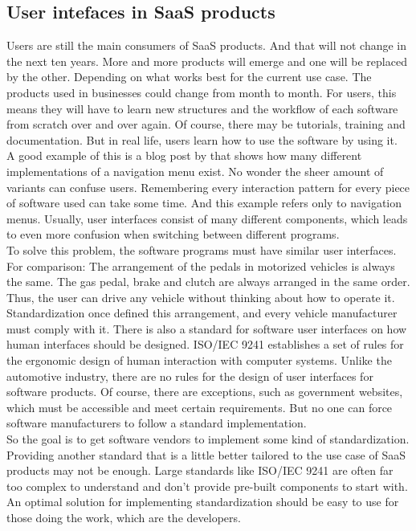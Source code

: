 \subsection{User intefaces in \ac{SaaS} products}
Users are still the main consumers of \ac{SaaS} products. And that will not change in the next ten years. More and more products will emerge and one will be replaced by the other. Depending on what works best for the current use case. The products used in businesses could change from month to month. For users, this means they will have to learn new structures and the workflow of each software from scratch over and over again. Of course, there may be tutorials, training and documentation. But in real life, users learn how to use the software by using it. \\
A good example of this is a blog post by \citeauthor{sernoff_website_2021} that shows how many different implementations of a navigation menu exist. No wonder the sheer amount of variants can confuse users. Remembering every interaction pattern for every piece of software used can take some time. And this example refers only to navigation menus. Usually, user interfaces consist of many different components, which leads to even more confusion when switching between different programs. \\
To solve this problem, the software programs must have similar user interfaces. For comparison: The arrangement of the pedals in motorized vehicles is always the same. The gas pedal, brake and clutch are always arranged in the same order. Thus, the user can drive any vehicle without thinking about how to operate it. Standardization once defined this arrangement, and every vehicle manufacturer must comply with it. There is also a standard for software user interfaces on how human interfaces should be designed. ISO/IEC 9241 establishes a set of rules for the ergonomic design of human interaction with computer systems. Unlike the automotive industry, there are no rules for the design of user interfaces for software products. Of course, there are exceptions, such as government websites, which must be accessible and meet certain requirements. But no one can force software manufacturers to follow a standard implementation. \\
So the goal is to get software vendors to implement some kind of standardization. Providing another standard that is a little better tailored to the use case of \ac{SaaS} products may not be enough. Large standards like ISO/IEC 9241 are often far too complex to understand and don't provide pre-built components to start with. An optimal solution for implementing standardization should be easy to use for those doing the work, which are the developers. \\
